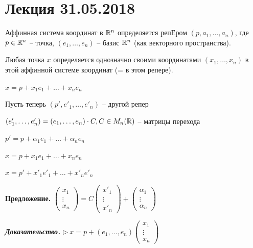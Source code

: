 \section{Лекция 31.05.2018}

Аффинная система координат в $\mathbb{R}^n$ определяется репЕром $(p, a_1, \dots, a_n)$, где $p \in \mathbb{R}^n$ -- точка, $(e_1, \dots, e_n)$ -- базис $\mathbb{R}^n$ (как векторного пространства).

\vspace{\baselineskip}
Любая точка $x$ определяется однозначно своими координатами $(x_1, \dots, x_n)$ в этой аффинной системе координат (= в этом репере).

$x = p + x_1 e_1 + \dots + x_n e_n$

\vspace{\baselineskip}
Пусть теперь $(p', e'_1, \dots, e'_n)$ -- другой репер

$(e'_1, \dots, e'_n) = (e_1, \dots, e_n) \cdot C, C \in M_n (\mathbb{R})$ -- матрицы перехода

$p' = p + \alpha_1 e_1 + \dots + \alpha_n e_n$

$x = p + x_1 e_1 + \dots + x_n e_n$

$x = p' + x'_1 e'_1 + \dots + x'_n e'_n$

\vspace{\baselineskip}
\textbf{Предложение.} $\begin{pmatrix} x_1 \\ \vdots \\ x_n \end{pmatrix} = C \begin{pmatrix} x'_1 \\ \vdots \\ x'_n \end{pmatrix} + \begin{pmatrix} \alpha_1 \\ \vdots \\ \alpha_n \end{pmatrix}$

\vspace{\baselineskip}
\textbf{\textit{Доказательство.}} $\rhd \ x = p + (e_1, \dots, e_n) \begin{pmatrix} x_1 \\ \vdots \\ x_n \end{pmatrix}$

